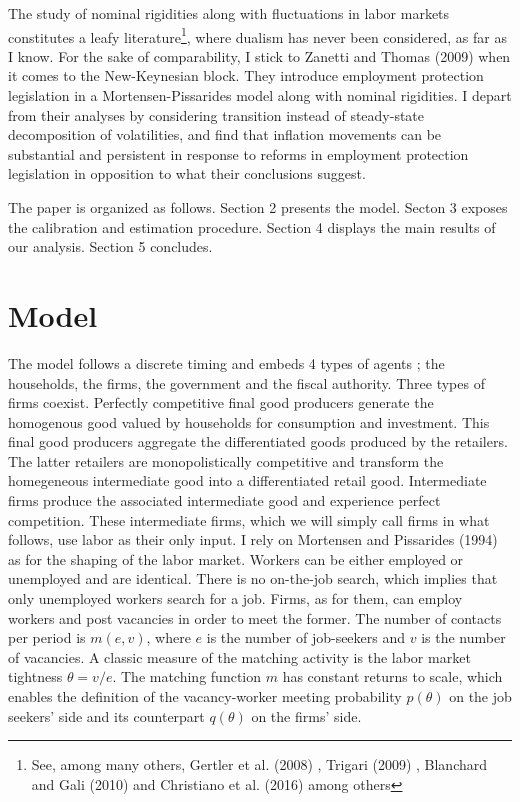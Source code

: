 \documentclass[a4paper]{article}
\begin{document}
The study of nominal rigidities along with fluctuations in labor markets constitutes a leafy literature\footnote{See, among many others, Gertler et al. (2008) \cite{gertler2008estimated}, Trigari (2009) \cite{trigari2009equilibrium}, Blanchard and Gali (2010) \cite{blanchard2010labor} and Christiano et al. (2016) \cite{christiano2016unemployment} among others}, where dualism has never been considered, as far as I know.  For the sake of comparability, I stick to Zanetti and Thomas (2009) \cite{THOMAS2009885} when it comes to the New-Keynesian block. They introduce employment protection legislation in a Mortensen-Pissarides model along with nominal rigidities. I depart from their analyses by considering transition instead of steady-state decomposition of volatilities, and find that inflation movements can be substantial and persistent in response to reforms in employment protection legislation in opposition to what their conclusions suggest.

The paper is organized as follows. Section 2 presents the model. Secton 3 exposes the calibration and estimation procedure. Section 4 displays the main results of our analysis. Section 5 concludes.  

\section{Model}

The model follows a discrete timing and embeds 4 types of agents ; the households, the firms, the government and the fiscal authority. Three types of firms coexist. Perfectly competitive final good producers generate the homogenous good valued by households for consumption and investment. This final good producers aggregate the differentiated goods produced by the retailers. The latter retailers are monopolistically competitive and transform the homegeneous intermediate good into a differentiated retail good. Intermediate firms produce the associated intermediate good and experience perfect competition. These intermediate firms, which we will simply call firms in what follows, use labor as their only input. I rely on Mortensen and Pissarides (1994) \cite{mortensen1994job} as for the shaping of the labor market. Workers can be either employed or unemployed and are identical. There is no on-the-job search, which implies that only unemployed workers search for a job. Firms, as for them, can employ workers and post vacancies in order to meet the former. The number of contacts per period is $m(e,v)$, where $e$ is the number of job-seekers and $v$ is the number of vacancies. A classic measure of the matching activity is the labor market tightness $\theta =  v/e$. The matching function $m$ has constant returns to scale, which enables the definition of the vacancy-worker meeting probability $p(\theta)$ on the job seekers' side and its counterpart $q(\theta)$ on the firms' side.
\end{document}

